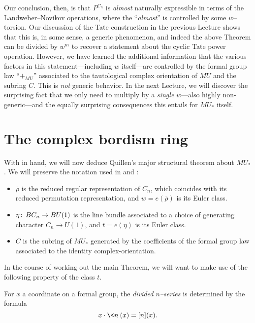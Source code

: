 Our conclusion, then, is that \(P^{C_n}\) is \emph{almost} naturally expressible in terms of the Landweber--Novikov operations, where the ``\emph{almost}'' is controlled by some \(w\)--torsion.  Our discussion of the Tate construction in the previous Lecture shows that this is, in some sense, a generic phenomenon, and indeed the above Theorem can be divided by \(w^m\) to recover a statement about the cyclic Tate power operation.  However, we have learned the additional information that the various factors in this statement---including \(w\) itself---are controlled by the formal group law ``\(+_{MU}\)'' associated to the tautological complex orientation of \(MU\) and the subring \(C\).  This is \emph{not} generic behavior.  In the next Lecture, we will discover the surprising fact that we only need to multiply by a \emph{single} \(w\)---also highly non-generic---and the equally surprising consequences this entails for \(MU_*\) itself.











\section{The complex bordism ring}\label{CalculationOfMUStarSection}

With  in hand, we will now deduce Quillen's major structural theorem about \(MU_*\).  We will preserve the notation used in  and :
\begin{itemize}
\item \(\overline \rho\) is the reduced regular representation of \(C_n\), which coincides with its reduced permutation representation, and \(w = e(\overline \rho)\) is its Euler class.
\item \(\eta\colon\thinspace BC_n \to BU(1)\) is the line bundle associated to a choice of generating character \(C_n \to U(1)\), and \(t = e(\eta)\) is its Euler class.
\item \(C\) is the subring of \(MU_*\) generated by the coefficients of the formal group law associated to the identity complex-orientation.
\end{itemize}
In the course of working out the main Theorem, we will want to make use of the following property of the class \(t\).

\begin{definition}
For \(x\) a coordinate on a formal group, the \textit{divided \(n\)--series} is determined by the formula \[x \cdot \<n\>(x) = [n](x).\]
\end{definition}

